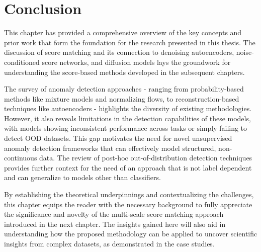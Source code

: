 \section{Conclusion}
This chapter has provided a comprehensive overview of the key concepts and prior work that form the foundation for the research presented in this thesis. The discussion of score matching and its connection to denoising autoencoders, noise-conditioned score networks, and diffusion models lays the groundwork for understanding the score-based methods developed in the subsequent chapters.

The survey of anomaly detection approaches - ranging from probability-based methods like mixture models and normalizing flows, to reconstruction-based techniques like autoencoders - highlights the diversity of existing methodologies. However, it also reveals limitations in the detection capabilities of these models, with models showing inconsistent performance across tasks or simply failing to detect OOD datasets. This gap motivates the need for novel unsupervised anomaly detection frameworks that can effectively model structured, non-continuous data. The review of post-hoc out-of-distribution detection techniques provides further context for the need of an approach that is not label dependent and can generalize to models other than classifiers. 

By establishing the theoretical underpinnings and contextualizing the challenges, this chapter equips the reader with the necessary background to fully appreciate the significance and novelty of the multi-scale score matching approach introduced in the next chapter. The insights gained here will also aid in understanding how the proposed methodology can be applied to uncover scientific insights from complex datasets, as demonstrated in the case studies.



